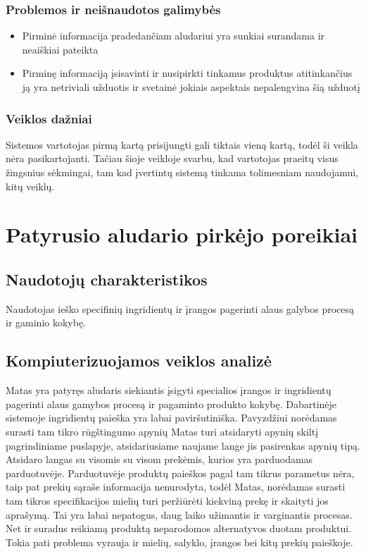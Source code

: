 \documentclass[oneside]{VUMIFPSkursinis}
\begin{document}
	\subsubsection{Problemos ir neišnaudotos galimybės}
		\begin{itemize}
			\item{Pirminė informacija pradedančiam aludariui yra sunkiai surandama ir neaiškiai pateikta}
			\item{Pirminę informaciją įsisavinti ir nusipirkti tinkamus produktus atitinkančius ją yra netriviali užduotis ir svetainė jokiais aspektais nepalengvina šią užduotį}
		\end{itemize}
	\subsubsection{Veiklos dažniai}
		Sistemos vartotojas pirmą kartą prisijungti gali tiktais vieną kartą, todėl ši veikla nėra pasikartojanti.
		Tačiau šioje veikloje svarbu, kad vartotojas praeitų visus žingsnius sėkmingai, tam kad įvertintų sistemą tinkama tolimesniam naudojamui, kitų veiklų.

\section{Patyrusio aludario pirkėjo poreikiai}
	\subsection{Naudotojų charakteristikos}
		Naudotojas ieško specifinių ingridientų ir įrangos pagerinti alaus galybos procesą ir gaminio kokybę.
	\subsection{Kompiuterizuojamos veiklos analizė}
		Matas yra patyręs aludaris siekiantis įsigyti specialios įrangos ir ingridientų pagerinti alaus gamybos procesą ir pagaminto produkto kokybę.
		Dabartinėje sistemoje ingridientų paieška yra labai paviršutiniška.
		Pavyzdžiui norėdamas surasti tam tikro rūgštingumo apynių Matas turi atsidaryti apynių skiltį pagrindiniame puslapyje, atsidariusiame naujame lange jis pasirenkas apynių tipą.
		Atsidaro langas su visomis su visom prekėmis, kurios yra parduodamas parduotuvėje.
		Parduotuvėje produktų paieškos pagal tam tikrus parametus nėra, taip pat prekių sąraše informacija nenurodyta, todėl Matas, norėdamas surasti tam tikros specifikacijos mielių turi peržiūrėti kiekviną prekę ir skaityti jos aprašymą.
		Tai yra labai nepatogus, daug laiko užimantis ir varginantis procesas.
		Net ir suradus reikiamą produktą neparodomos alternatyvos duotam produktui.
		Tokia pati problema vyrauja ir mielių, salyklo, įrangos bei kitų prekių paieškoje.
\end{document}

